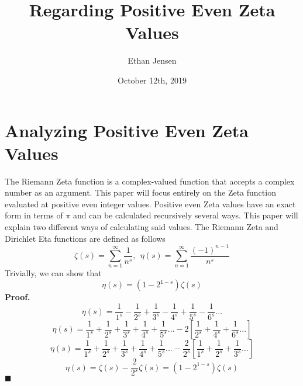 \documentclass[12pt]{article}
\title{Regarding Positive Even Zeta Values}
\author{Ethan Jensen}
\date{October 12th, 2019}
\begin{document}
	\maketitle
	\tikzset{
		node distance=3cm, %
		initial text=$ $, %
	}

\section[20pt]{Analyzing Positive Even Zeta Values}
The Riemann Zeta function is a complex-valued function that accepts a complex number as an argument. This paper will focus entirely on the Zeta function evaluated at positive even integer values. Positive even Zeta values have an exact form in terms of \(\pi\) and can be calculated recursively several ways. This paper will explain two different ways of calculating said values. \newline \newline
The Riemann Zeta and Dirichlet Eta functions are defined as follows
\[\zeta(s)=\sum_{n=1}^{\infty}\frac{1}{n^s},\ \  \eta(s)=\sum_{n=1}^{\infty}\frac{(-1)^{n-1}}{n^s}\]
Trivially, we can show that \[\eta(s)=(1-2^{1-s})\zeta(s)\]
\textbf{Proof.}
\[\eta(s) = \frac{1}{1^s} - \frac{1}{2^s} + \frac{1}{3^s} - \frac{1}{4^s} + \frac{1}{5^s} - \frac{1}{6^s}...\]
\[\eta(s) = \frac{1}{1^s} + \frac{1}{2^s} + \frac{1}{3^s} + \frac{1}{4^s} + \frac{1}{5^s}...-2\left[\frac{1}{2^s} + \frac{1}{4^s} + \frac{1}{6^s}...\right]\]
\[\eta(s) = \frac{1}{1^s} + \frac{1}{2^s} + \frac{1}{3^s} + \frac{1}{4^s} + \frac{1}{5^s}...-\frac{2}{2^s}\left[\frac{1}{1^s} + \frac{1}{2^s} + \frac{1}{3^s}...\right]\]
\[\eta(s)=\zeta(s)-\frac{2}{2^s}\zeta(s)=(1-2^{1-s})\zeta(s)\]
\(\blacksquare\) \newline
\newpage
\end{document}
